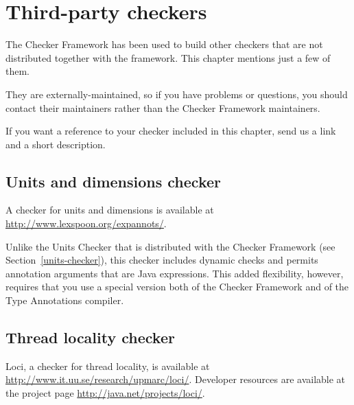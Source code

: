 \htmlhr
\chapter{Third-party checkers\label{third-party-checkers}\label{external-checkers}}

The Checker Framework has been used to build other checkers that are not
distributed together with the framework.  This chapter mentions just a few
of them.

They are externally-maintained, so if you have problems or questions, you
should contact their maintainers rather than the Checker Framework
maintainers.

If you want a reference to your checker included in this chapter,
send us a link and a short description.







\section{Units and dimensions checker\label{units-and-dimensions-checker}}

A checker for units and dimensions is available at
\url{http://www.lexspoon.org/expannots/}.

Unlike the Units Checker that is distributed with the Checker Framework
(see Section~\ref{units-checker}), this checker includes dynamic checks and
permits annotation arguments that are Java expressions.  This added
flexibility, however, requires that you use a special version both of the
Checker Framework and of the Type Annotations compiler.


\section{Thread locality checker\label{loci-thread-locality-checker}}

Loci, a checker for thread locality, is available at
\url{http://www.it.uu.se/research/upmarc/loci/}.
Developer resources are available at the project page
\url{http://java.net/projects/loci/}.





